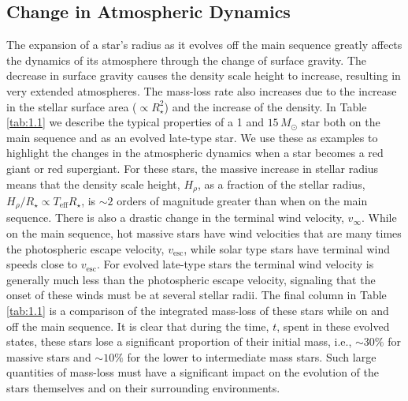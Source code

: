 \subsection{Change in Atmospheric Dynamics}\label{sec:1.5.1}
The expansion of a star's radius as it evolves off the main sequence greatly affects the dynamics of its atmosphere through the change of surface gravity. The decrease in surface gravity causes the density scale height to increase, resulting in very extended atmospheres. The mass-loss rate also increases due to the increase in the stellar surface area ($\propto R_{\star}^2$) and the increase of the density. In Table \ref{tab:1.1} we describe the typical properties of a 1 and $15\,M_{\odot}$ star both on the main sequence and as an evolved late-type star. We use these as examples to highlight the changes in the atmospheric dynamics when a star becomes a red giant or red supergiant. For these stars, the massive increase in stellar radius means that the density scale height, $H_{\rho}$, as a fraction of the stellar radius, $H_{\rho}/R_{\star} \propto T_{\mathrm{eff}}R_{\star}$, is $\sim 2$ orders of magnitude greater than when on the main sequence. There is also a drastic change in the terminal wind velocity, $v_{\infty}$. While on the main sequence, hot massive stars have wind velocities that are many times the photospheric escape velocity, $v_{\mathrm{esc}}$, while solar type stars have terminal wind speeds close to $v_{\mathrm{esc}}$. For evolved late-type stars the terminal wind velocity is generally much less than the photospheric escape velocity, signaling that the onset of these winds must be at several stellar radii. The final column in Table \ref{tab:1.1} is a comparison of the integrated mass-loss of these stars while on and off the main sequence. It is clear that during the time, $t$, spent in these evolved states, these stars lose a significant proportion of their initial mass, i.e., $\sim 30\%$ for massive stars and $\sim 10\%$ for the lower to intermediate mass stars. Such large quantities of mass-loss must have a significant impact on the evolution of the stars themselves and on their surrounding environments.


